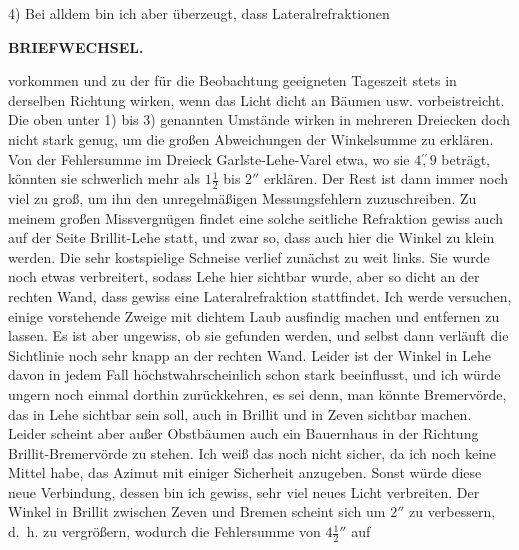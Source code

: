 \par\noindent\hspace*{\parindent}4) Bei alldem bin ich aber überzeugt, dass Lateralrefraktionen
\par\medskip\noindent\makebox[.86\linewidth][r]{62\textsuperscript{*}}\par

\par\clearpage
\noindent{}\hfill{\small\textbf{BRIEFWECHSEL.}}\hfill\null\par\medskip
\noindent vorkommen und zu der für die Beobachtung geeigneten Tageszeit stets in derselben Richtung wirken, wenn das Licht dicht an Bäumen usw. vorbeistreicht. Die oben unter 1) bis 3) genannten Umstände wirken in mehreren Dreiecken doch nicht stark genug, um die großen Abweichungen der Winkelsumme zu erklären. Von der Fehlersumme im Dreieck Garlste-Lehe-Varel etwa, wo sie $4\overset{\prime\prime}{,}9$ beträgt, könnten sie schwerlich mehr als $1\frac12$ bis $2''$ erklären. Der Rest ist dann immer noch viel zu groß, um ihn den unregelmäßigen Messungsfehlern zuzuschreiben. Zu meinem großen Missvergnügen findet eine solche seitliche Refraktion gewiss auch auf der Seite Brillit-Lehe statt, und zwar so, dass auch hier die Winkel zu klein werden. Die sehr kostspielige Schneise verlief zunächst zu weit links. Sie wurde noch etwas verbreitert, sodass Lehe hier sichtbar wurde, aber so dicht an der rechten Wand, dass gewiss eine Lateralrefraktion stattfindet. Ich werde versuchen, einige vorstehende Zweige mit dichtem Laub ausfindig machen und entfernen zu lassen. Es ist aber ungewiss, ob sie gefunden werden, und selbst dann verläuft die Sichtlinie noch sehr knapp an der rechten Wand. Leider ist der Winkel in Lehe davon in jedem Fall höchstwahrscheinlich schon stark beeinflusst, und ich würde ungern noch einmal dorthin zurückkehren, es sei denn, man könnte Bremervörde, das in Lehe sichtbar sein soll, auch in Brillit und in Zeven sichtbar machen. Leider scheint aber außer Obstbäumen auch ein Bauernhaus in der Richtung Brillit-Bremervörde zu stehen. Ich weiß das noch nicht sicher, da ich noch keine Mittel habe, das Azimut mit einiger Sicherheit anzugeben. Sonst würde diese neue Verbindung, dessen bin ich gewiss, sehr viel neues Licht verbreiten. Der Winkel in Brillit zwischen Zeven und Bremen scheint sich um $2''$ zu verbessern, d.~h. zu vergrößern, wodurch die Fehlersumme von $4\frac12{}''$ auf
